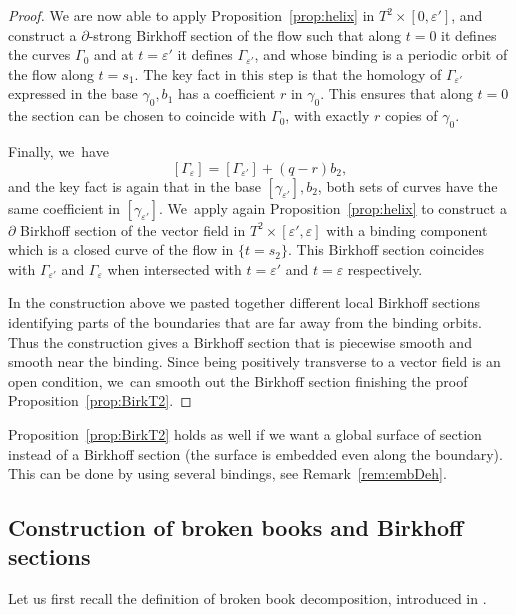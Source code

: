 \begin{proof}
We are now able to apply Proposition~\ref{prop:helix} in $T^2\times [0,\varepsilon']$, and construct a $\partial$-strong Birkhoff section of the flow such that along $t=0$ it defines the curves $\Gamma_0$ and at $t=\varepsilon'$ it defines $\Gamma_{\varepsilon'}$, and whose binding is a periodic orbit of the flow along $t=s_1$. The key fact in this step is that the homology of $\Gamma_{\varepsilon'}$ expressed in the base $\gamma_0, b_1$ has a coefficient $r$ in $\gamma_0$. This ensures that along $t=0$ the section can be chosen to coincide with $\Gamma_0$, \ie with exactly $r$ copies of $\gamma_0$.

Finally, we~have
\[
[\Gamma_\varepsilon]= [\Gamma_{\varepsilon'}]+ (q-r)b_2,
\]
and the key fact is again that in the base $[\gamma_{\varepsilon'}], b_2$, both sets of curves have the same coefficient in $[\gamma_{\varepsilon'}]$. We~apply again Proposition~\ref{prop:helix} to construct a $\partial$ Birkhoff section of the vector field in $T^2\times [\varepsilon',\varepsilon]$ with a binding component which is a closed curve of the flow in $\{t=s_2\}$. This Birkhoff section coincides with $\Gamma_{\varepsilon'}$ and $\Gamma_{\varepsilon}$ when intersected with $t=\varepsilon'$ and $t=\varepsilon$ respectively.

In the construction above we pasted together different local Birkhoff sections identifying parts of the boundaries that are far away from the binding orbits. Thus the construction gives a Birkhoff section that is piecewise smooth and smooth near the binding. Since being positively transverse to a vector field is an open condition, we~can smooth out the Birkhoff section finishing the proof Proposition~\ref{prop:BirkT2}.
\end{proof}

\begin{Remark}
Proposition~\ref{prop:BirkT2} holds as well if we want a global surface of section instead of a Birkhoff section (\ie the surface is embedded even along the boundary). This can be done by using several bindings, see Remark~\ref{rem:embDeh}.
\end{Remark}

\subsection{Construction of broken books and Birkhoff sections} \label{sec:bbook}

Let us first recall the definition of broken book decomposition, introduced in \cite{CDR}.

